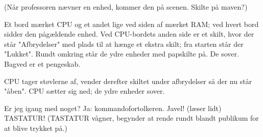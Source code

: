 \documentclass[a4paper,11pt]{article}
\begin{document}
\begin{sketch}
\scene
(Når professoren nævner en enhed, kommer den på scenen. Skilte
på maven?)

Et bord mærket CPU og et andet lige ved siden af mærket RAM;
ved hvert bord sidder den pågældende enhed. Ved CPU-bordets
anden side er et skilt, hvor der står "Afbrydelser" med plads
til at hænge et ekstra skilt; fra starten står der "Lukket".
Rundt omkring står de ydre enheder med papskilte på. De
sover. Bagved er et pengeskab.

CPU tager støvlerne af, vender derefter skiltet under afbrydelser så
der nu står "åben". CPU sætter sig ned; de ydre enheder sover.


 Er jeg igang med noget?
 Ja: kommandofortolkeren.
 Javel! (læser lidt) TASTATUR!
\scene 
(TASTATUR vågner, begynder at rende rundt blandt publikum for at
blive trykket på.)


\end{sketch}
\end{document}
